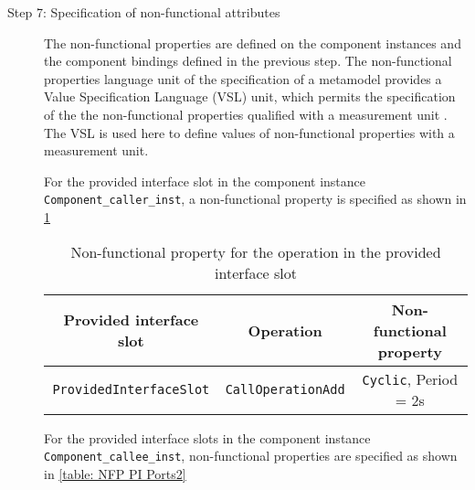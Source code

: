 \begin{description}
\item [Step 7: Specification of non-functional attributes] The non-functional properties are defined on the component instances and the component bindings defined in the previous step. The non-functional properties language unit of the specification of a metamodel provides a Value Specification Language (VSL) unit, which permits the specification of the the non-functional properties qualified with a measurement unit \cite{SpecMetamodel}. The VSL is used here to define values of non-functional properties with a measurement unit.

For the provided interface slot in the component instance \texttt{Component\allowbreak\_caller\allowbreak\_inst}, a non-functional property is specified as shown in \cref{table: NFP PI Ports1}

\begin{table}[]
	\centering
	\caption{Non-functional property for the operation in the provided interface slot}
	\label{table: NFP PI Ports1}
	\begin{tabular}{lll}
		\hline
		\multicolumn{1}{|c|}{\textbf{Provided interface slot}} & \multicolumn{1}{c|}{\textbf{Operation}} & \multicolumn{1}{c|}{\textbf{Non-functional property}} \\ \hline
		\multicolumn{1}{|c|}{\texttt{ProvidedInterfaceSlot}} & \multicolumn{1}{c|}{\texttt{CallOperationAdd}} & \multicolumn{1}{c|}{\texttt{Cyclic}, Period = 2s} \\ \hline
	\end{tabular}
\end{table}

For the provided interface slots in the component instance \texttt{Component\allowbreak\_callee\_inst}, non-functional properties are specified as shown in \cref{table: NFP PI Ports2}


\end{description}
